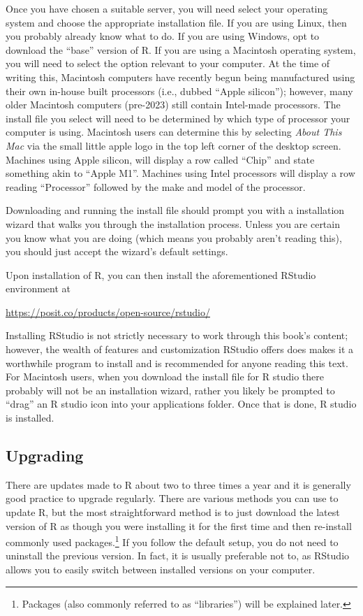 Once you have chosen a suitable server, you will need select your operating system and choose the appropriate installation file. If you are using Linux, then you probably already know what to do. If you are using Windows, opt to download the ``base'' version of R.  If you are using a Macintosh operating system, you will need to select the option relevant to your computer.  At the time of writing this, Macintosh computers have recently begun being manufactured using their own in-house built processors (i.e., dubbed ``Apple silicon''); however, many older Macintosh computers (pre-2023) still contain Intel-made processors. The install file you select will need to be determined by which type of processor your computer is using. Macintosh users can determine this by selecting \textit{About This Mac} via the small little apple logo in the top left corner of the desktop screen. Machines using Apple silicon, will display a row called ``Chip'' and state something akin to ``Apple M1''. Machines using Intel processors will display a row reading ``Processor'' followed by the make and model of the processor.

Downloading and running the install file should prompt you with a installation wizard that walks you through the installation process. Unless you are certain you know what you are doing (which means you probably aren't reading this), you should just accept the wizard's default settings.

Upon installation of R, you can then install the aforementioned RStudio environment at

\begin{center}
\url{https://posit.co/products/open-source/rstudio/}
\end{center}

Installing RStudio is not strictly necessary to work through this book's content; however, the wealth of features and customization RStudio offers does makes it a worthwhile program to install and is recommended for anyone reading this text. For Macintosh users, when you download the install file for R studio there probably will not be an installation wizard, rather you likely be prompted to ``drag'' an R studio icon into your applications folder. Once that is done, R studio is installed.

\subsection{Upgrading}

There are updates made to R about two to three times a year and it is generally good practice to upgrade regularly. There are various methods you can use to update R, but the most straightforward method is to just download the latest version of R as though you were installing it for the first time and then re-install commonly used packages.\footnote{Packages (also commonly referred to as ``libraries'') will be explained later.} If you follow the default setup, you do not need to uninstall the previous version. In fact, it is usually preferable not to, as RStudio allows you to easily switch between installed versions on your computer.

